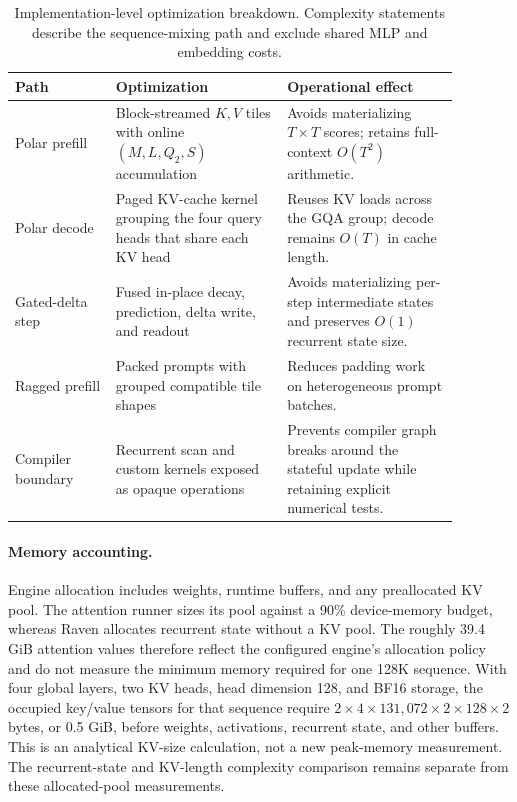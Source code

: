 \begin{table}[!ht]
\centering
\small
\begin{tabular}{p{0.20\linewidth}p{0.34\linewidth}p{0.34\linewidth}}
\toprule
\textbf{Path} & \textbf{Optimization} & \textbf{Operational effect} \\
\midrule
Polar prefill & Block-streamed $K,V$ tiles with online $(M,L,Q_2,S)$ accumulation & Avoids materializing $T\times T$ scores; retains full-context $O(T^2)$ arithmetic. \\
Polar decode & Paged KV-cache kernel grouping the four query heads that share each KV head & Reuses KV loads across the GQA group; decode remains $O(T)$ in cache length. \\
Gated-delta step & Fused in-place decay, prediction, delta write, and readout & Avoids materializing per-step intermediate states and preserves $O(1)$ recurrent state size. \\
Ragged prefill & Packed prompts with grouped compatible tile shapes & Reduces padding work on heterogeneous prompt batches. \\
Compiler boundary & Recurrent scan and custom kernels exposed as opaque operations & Prevents compiler graph breaks around the stateful update while retaining explicit numerical tests. \\
\bottomrule
\end{tabular}
\caption{Implementation-level optimization breakdown. Complexity statements describe the sequence-mixing path and exclude shared MLP and embedding costs.}
\label{table:kernel_breakdown}
\end{table}

\paragraph{Memory accounting.}
Engine allocation includes weights, runtime buffers, and any preallocated KV pool. The attention runner sizes its pool against a 90\% device-memory budget, whereas Raven allocates recurrent state without a KV pool. The roughly 39.4 GiB attention values therefore reflect the configured engine's allocation policy and do not measure the minimum memory required for one 128K sequence. With four global layers, two KV heads, head dimension 128, and BF16 storage, the occupied key/value tensors for that sequence require $2\times4\times131{,}072\times2\times128\times2$ bytes, or 0.5 GiB, before weights, activations, recurrent state, and other buffers. This is an analytical KV-size calculation, not a new peak-memory measurement. The recurrent-state and KV-length complexity comparison remains separate from these allocated-pool measurements.

